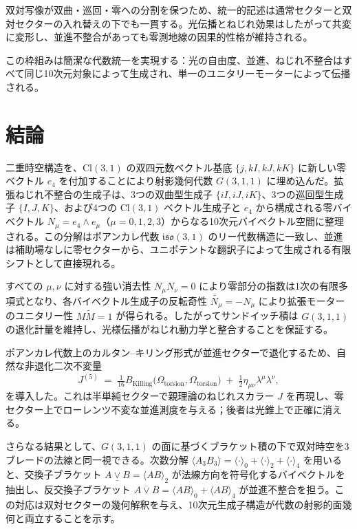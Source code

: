 \documentclass[11pt,a4paper]{article}
\begin{document}
双対写像が双曲・巡回・零への分割を保つため、統一的記述は通常セクターと双対セクターの入れ替えの下でも一貫する。光伝播とねじれ効果はしたがって共変に変形し、並進不整合があっても零測地線の因果的性格が維持される。

この枠組みは簡潔な代数統一を実現する：光の自由度、並進、ねじれ不整合はすべて同じ10次元対象によって生成され、単一のユニタリーモーターによって伝播される。

\section{結論}

二重時空構造を、$\mathrm{Cl}(3,1)$ の双四元数ベクトル基底 $\{j, kI, kJ, kK\}$ に新しい零ベクトル $e_{4}$ を付加することにより射影幾何代数 $G(3,1,1)$ に埋め込んだ。拡張ねじれ不整合の生成子は、3つの双曲型生成子 $\{iI,iJ,iK\}$、3つの巡回型生成子 $\{I,J,K\}$、および4つの $\mathrm{Cl}(3,1)$ ベクトル生成子と $e_{4}$ から構成される零バイベクトル $N_{\mu}=e_{4}\wedge e_{\mu}$（$\mu=0,1,2,3$）からなる10次元バイベクトル空間に整理される。この分解はポアンカレ代数 $\mathfrak{iso}(3,1)$ のリー代数構造に一致し、並進は補助場なしに零セクターから、ユニポテントな翻訳子によって生成される有限シフトとして直接現れる。

すべての $\mu,\nu$ に対する強い消去性 $N_{\mu}N_{\nu}=0$ により零部分の指数は1次の有限多項式となり、各バイベクトル生成子の反転奇性 $\widetilde{N_{\mu}}=-N_{\mu}$ により拡張モーターのユニタリー性 $M\widetilde{M}=1$ が得られる。したがってサンドイッチ積は $G(3,1,1)$ の退化計量を維持し、光様伝播がねじれ動力学と整合することを保証する。

ポアンカレ代数上のカルタン--キリング形式が並進セクターで退化するため、自然な非退化二次不変量
\[
J^{(5)} \;=\; \tfrac{1}{16}B_{\text{Killing}}\!\bigl(\Omega_{\text{torsion}},\Omega_{\text{torsion}}\bigr) \;+\; \tfrac{1}{2}\eta_{\mu\nu}\lambda^{\mu}\lambda^{\nu},
\]
を導入した。これは半単純セクターで親理論のねじれスカラー $J$ を再現し、零セクター上でローレンツ不変な並進測度を与える；後者は光錐上で正確に消える。

さらなる結果として、$G(3,1,1)$ の面に基づくブラケット積の下で双対時空を3ブレードの法線と同一視できる。次数分解 $\langle A_{3}B_{3}\rangle = \langle\cdot\rangle_{0}+\langle\cdot\rangle_{2}+\langle\cdot\rangle_{4}$ を用いると、交換子ブラケット $A\mathbin{\underline{\vee}}B=\langle AB\rangle_{2}$ が法線方向を符号化するバイベクトルを抽出し、反交換子ブラケット $A\mathbin{\overline{\vee}}B=\langle AB\rangle_{0}+\langle AB\rangle_{4}$ が並進不整合を担う。この対応は双対セクターの幾何解釈を与え、10次元生成子構造が代数の射影的面幾何と両立することを示す。
\end{document}
